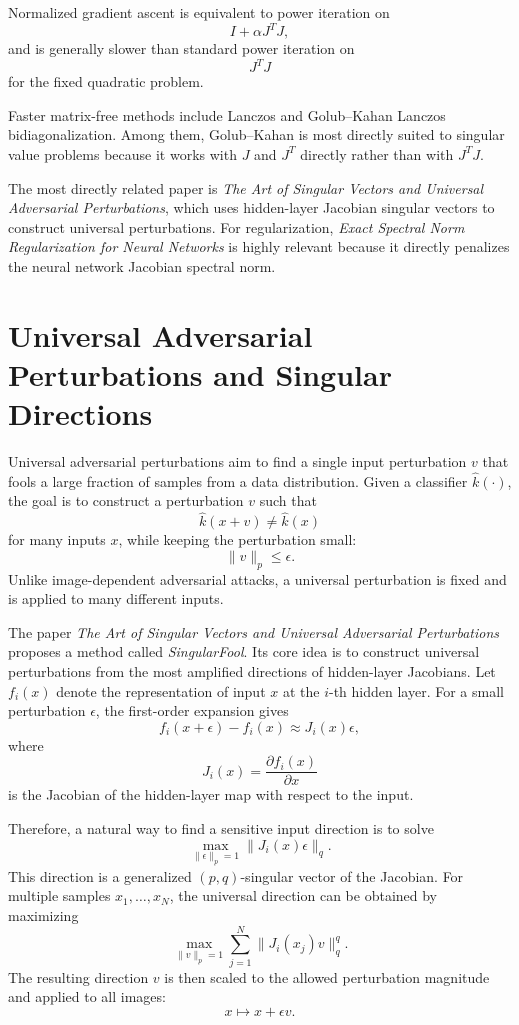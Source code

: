 \documentclass{article}
\begin{document}
Normalized gradient ascent is equivalent to power iteration on
\[
I+\alpha J^TJ,
\]
and is generally slower than standard power iteration on
\[
J^TJ
\]
for the fixed quadratic problem.

Faster matrix-free methods include Lanczos and Golub--Kahan Lanczos bidiagonalization. Among them, Golub--Kahan is most directly suited to singular value problems because it works with \(J\) and \(J^T\) directly rather than with \(J^TJ\).

The most directly related paper is \emph{The Art of Singular Vectors and Universal Adversarial Perturbations}, which uses hidden-layer Jacobian singular vectors to construct universal perturbations. For regularization, \emph{Exact Spectral Norm Regularization for Neural Networks} is highly relevant because it directly penalizes the neural network Jacobian spectral norm.

\section{Universal Adversarial Perturbations and Singular Directions}

Universal adversarial perturbations aim to find a single input perturbation \(v\) that fools a large fraction of samples from a data distribution. Given a classifier \(\hat{k}(\cdot)\), the goal is to construct a perturbation \(v\) such that
\[
\hat{k}(x+v)\neq \hat{k}(x)
\]
for many inputs \(x\), while keeping the perturbation small:
\[
\|v\|_p \leq \epsilon.
\]
Unlike image-dependent adversarial attacks, a universal perturbation is fixed and is applied to many different inputs.

The paper \emph{The Art of Singular Vectors and Universal Adversarial Perturbations} proposes a method called \emph{SingularFool}. Its core idea is to construct universal perturbations from the most amplified directions of hidden-layer Jacobians. Let \(f_i(x)\) denote the representation of input \(x\) at the \(i\)-th hidden layer. For a small perturbation \(\epsilon\), the first-order expansion gives
\[
f_i(x+\epsilon)-f_i(x)\approx J_i(x)\epsilon,
\]
where
\[
J_i(x)=\frac{\partial f_i(x)}{\partial x}
\]
is the Jacobian of the hidden-layer map with respect to the input.

Therefore, a natural way to find a sensitive input direction is to solve
\[
\max_{\|\epsilon\|_p=1}\|J_i(x)\epsilon\|_q.
\]
This direction is a generalized \((p,q)\)-singular vector of the Jacobian. For multiple samples \(x_1,\dots,x_N\), the universal direction can be obtained by maximizing
\[
\max_{\|v\|_p=1}\sum_{j=1}^N \|J_i(x_j)v\|_q^q.
\]
The resulting direction \(v\) is then scaled to the allowed perturbation magnitude and applied to all images:
\[
x \mapsto x+\epsilon v.
\]
\end{document}
